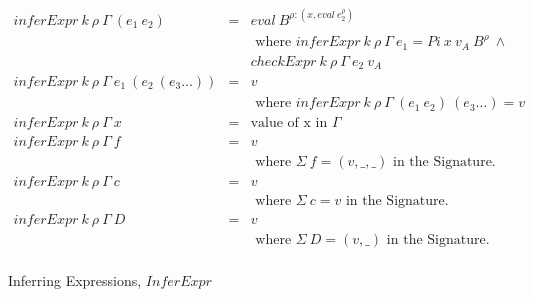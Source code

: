 \documentclass[acmsmall]{acmart}
\begin{document}
\begin{figure}[H]
  \begin{equation*}
    \begin{aligned}
      inferExpr \: k \: \rho \: \Gamma \: (e_1 \: e_2)                & = & eval \: B^{\rho:(x,eval \: e_2^{\rho})}                                                        \\
                                                                      &   & \textrm{ where } inferExpr \: k \: \rho \: \Gamma \: e_1 = Pi \: x \: v_A \: B^{\rho} \: \land \\
                                                                      &   & checkExpr \: k \: \rho \: \Gamma \: e_2 \: v_A                                                 \\
      inferExpr \: k \: \rho \: \Gamma \: e_1 \: (e_2 \: (e_3 \dots)) & = & v                                                                                              \\
                                                                      &   & \textrm{ where } inferExpr \: k \: \rho \: \Gamma \: (e_1 \: e_2) \: (e_3 \dots) = v           \\                                                      
      inferExpr \: k \: \rho \: \Gamma \: x                           & = & \textrm{value of x in } \Gamma                                                                 \\
      inferExpr \: k \: \rho \: \Gamma \: f                           & = & v                                                                                              \\
                                                                      &   & \textrm{ where } \Sigma \: f = (v,\_,\_) \textrm{ in the Signature.}                           \\
      inferExpr \: k \: \rho \: \Gamma \: c                           & = & v                                                                                              \\
                                                                      &   & \textrm{ where } \Sigma \: c = v \textrm{ in the Signature.}                                   \\
      inferExpr \: k \: \rho \: \Gamma \: D                           & = & v                                                                                              \\
                                                                      &   & \textrm{ where } \Sigma \: D = (v,\_) \textrm{ in the Signature.}                              \\                                            
    \end{aligned}
  \end{equation*}
  \caption{Inferring Expressions, $InferExpr$}
\end{figure}
\end{document}
